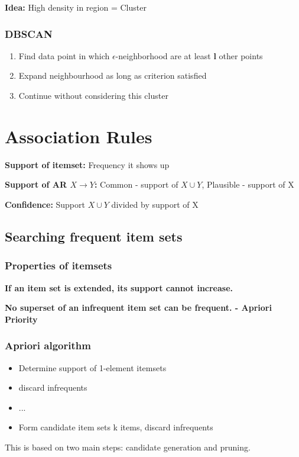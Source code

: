 \documentclass[fleqn, oneside, 10pt, titlepage]{article}
\begin{document}
\textbf{Idea:} High density in region = Cluster

\subsubsection{DBSCAN}
\begin{enumerate}
	\item Find data point in which $\epsilon$-neighborhood are at least \textbf{l} other points
	\item Expand neighbourhood as long as criterion satisfied
	\item Continue without considering this cluster
\end{enumerate}

\section{Association Rules}
\textbf{Support of itemset:} Frequency it shows up

\textbf{Support of AR $X \rightarrow Y$:} Common - support of $X \cup Y$, Plausible - support of X

\textbf{Confidence:} Support $X\cup Y$ divided by support of X

\subsection{Searching frequent item sets}
\subsubsection{Properties of itemsets}
\textbf{If an item set is extended, its support cannot increase.}

\textbf{No superset of an infrequent item set can be frequent. - Apriori Priority}

\subsubsection{Apriori algorithm}
\begin{itemize}
	\item Determine support of 1-element itemsets
	\item discard infrequents
	\item ...
	\item Form candidate item sets k items, discard infrequents
\end{itemize}

This is based on two main steps: candidate generation and pruning.
\end{document}
